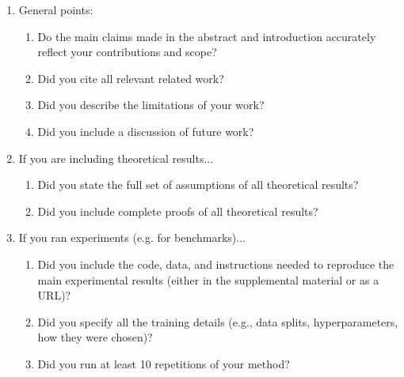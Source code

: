 \documentclass{article}
\begin{document}
\begin{enumerate}

\item General points:
\begin{enumerate}
  \item Do the main claims made in the abstract and introduction accurately
  reflect your contributions and scope?
    \answerYes

  \item Did you cite all relevant related work?
    \answerYes

  \item Did you describe the limitations of your work?

  \item Did you include a discussion of future work?
\end{enumerate}

\item If you are including theoretical results...
\begin{enumerate}
  \item Did you state the full set of assumptions of all theoretical results?

  \item Did you include complete proofs of all theoretical results?
\end{enumerate}

\item If you ran experiments (e.g. for benchmarks)...
\begin{enumerate}
  \item Did you include the code, data, and instructions needed to reproduce
  the main experimental results (either in the supplemental material or as a
  URL)?

  \item Did you specify all the training details (e.g., data splits,
  hyperparameters, how they were chosen)?

  \item Did you run at least 10 repetitions of your method?


\end{enumerate}
\end{enumerate}
\end{document}
